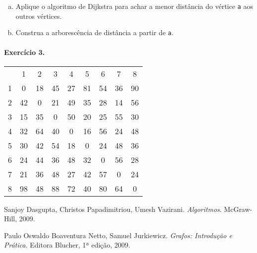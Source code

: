 \documentclass[12pt]{article}
\begin{document}
\begin{enumerate}[a)]
\item Aplique o algoritmo de Dijkstra para achar a menor distância do vértice
  {\tt a} aos outros vértices.
\item Construa a arborescência de distância a partir de {\tt a}.
\end{enumerate}\bigskip


\paragraph{Exercício 3.}

\begin{center}
  \begin{tabular}[hf]{ccccccccc}
     & 1 & 2  & 3  & 4  & 5  & 6  & 7  & 8  \\
    1 & 0 & 18 & 45 & 27 & 81 & 54 & 36 & 90 \\
    2 & 42 & 0 & 21 & 49 & 35 & 28 & 14 & 56 \\
     3 & 15 & 35 & 0 & 50 & 20 & 25 & 55 & 30 \\
    4 & 32 & 64 & 40 & 0 & 16 & 56 & 24 & 48 \\
     5 & 30 & 42 & 54 & 18 & 0 & 24 & 48 & 36 \\
     6 & 24 & 44 & 36 & 48 & 32 & 0 & 56 & 28 \\
     7 & 21 & 36 & 48 & 27 & 42 & 57 & 0 & 24 \\
     8 & 98 & 48 & 88 & 72 & 40 & 80 & 64 & 0 \\
  \end{tabular}
\end{center}

\begin{thebibliography}{9}
    {Sanjoy Dasgupta, Christos Papadimitriou, Umesh Vazirani}.
    \emph{Algoritmos}.
    McGraw-Hill,
    2009.

  {Paulo Oswaldo Boaventura Netto, Samuel Jurkiewicz}.
  \emph{Grafos: Introdução e Prática}.
  Editora Blucher, 1ª edição, 2009.

\end{thebibliography}
\end{document}
